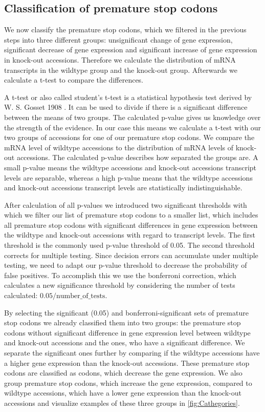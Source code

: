 \subsection*{Classification of premature stop codons}
We now classify the premature stop codons, which we filtered in the previous steps into three different groups: unsignificant change of gene expression, significant decrease of gene expression and significant increase of gene expression in knock-out accessions.  Therefore we calculate the distribution of mRNA transcripts in the wildtype group and the knock-out group. Afterwards we calculate a t-test to compare the differences. 

A t-test or also called student's t-test is a statistical hypothesis test derived by W. S. Gosset 1908 \cite{student1908}. It can be used to divide if there is a significant difference between the means of two groups. The calculated p-value gives us knowledge over the strength of the evidence. In our case this means we calculate a t-test with our two groups of accessions for one of our premature stop codons. We compare the mRNA level of wildtype accessions to the distribution of mRNA levels of knock-out accessions. The calculated p-value describes how separated the groups are. A small p-value means the wildtype accessions and knock-out accessions transcript levels are separable, whereas a high p-value means that the wildtype accessions and knock-out accessions transcript levels are statistically indistinguishable.

After calculation of all p-values we introduced two significant thresholds with which we filter our list of premature stop codons to a smaller list, which includes all premature stop codons with significant differences in gene expression between the wildtype and knock-out accessions with regard to transcript levels. The first threshold is the commonly used p-value threshold of 0.05. The second threshold corrects for multiple testing. Since decision errors can accumulate under multiple testing, we need to adapt our p-value threshold to decrease the probability of false positives. To accomplish this we use the bonferroni correction\cite{dunn1961}, which calculates a new significance threshold by considering the number of tests calculated: $0.05 / \text{number\_of\_tests}$. 

By selecting the significant (0.05) and bonferroni-significant sets of premature stop codons we already classified them into two groups: the premature stop codons without significant difference in gene expression level between wildtype and knock-out accessions and the ones, who have a significant difference. We separate the significant ones further by comparing if the wildtype accessions have a higher gene expression than the knock-out accessions. These premature stop codons are classified as codons, which decrease the gene expression. We also group premature stop codons, which increase the gene expression, compared to wildtype accessions, which have a lower gene expression than the knock-out accessions and visualize examples of these three groups in \autoref{fig:Cathegories}.

